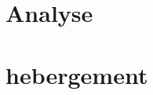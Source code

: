 \documentclass[12pt]{article}
\begin{document}
%
%
%
%
%
%
%
%
%
%
%
%
%





    \section{Analyse}\label{sec:analyse}
    



    \section{hebergement}
    \newpage
\end{document}
